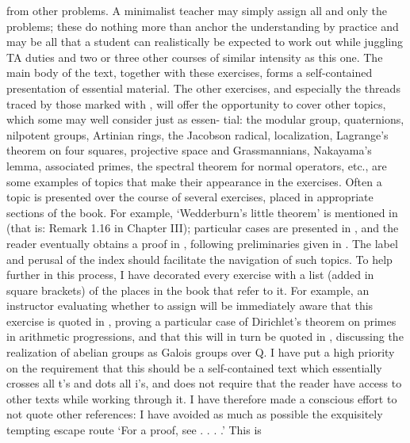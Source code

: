 from other problems. A minimalist teacher may simply assign all and
only the \exerused{} problems; these do nothing more than anchor the
understanding by practice and may be all that a student can
realistically be expected to work out while juggling TA duties and two
or three other courses of similar intensity as this one. The main body
of the text, together with these exercises, forms a self-contained
presentation of essential material.  The other exercises, and
especially the threads traced by those marked with \lnot{} , will
offer the opportunity to cover other topics, which some may well
consider just as essen- tial: the modular group, quaternions,
nilpotent groups, Artinian rings, the Jacobson radical, localization,
Lagrange's theorem on four squares, projective space and
Grassmannians, Nakayama's lemma, associated primes, the spectral
theorem for normal operators, etc., are some examples of topics that
make their appearance in the exercises. Often a topic is presented
over the course of several exercises, placed in appropriate sections
of the book. For example, `Wedderburn's little theorem' is mentioned
in  (that is: Remark 1.16 in Chapter III);
particular cases are presented in
,
and the reader eventually obtains a proof in
, following preliminaries
given in
. The
\lnot{} label and perusal of the index should facilitate the
navigation of such topics. To help further in this process, I have
decorated every exercise with a list (added in square brackets) of the
places in the book that refer to it.  For example, an instructor
evaluating whether to assign
 will be immediately
aware that this exercise is quoted in
, proving a
particular case of Dirichlet's theorem on primes in arithmetic
progressions, and that this will in turn be quoted in
,
discussing the realization of abelian groups as Galois groups over Q.
I have put a high priority on the requirement that this should be a
self-contained text which essentially crosses all t's and dots all
i's, and does not require that the reader have access to other texts
while working through it. I have therefore made a conscious effort to
not quote other references: I have avoided as much as possible the
exquisitely tempting escape route `For a proof, see . . . .' This is
